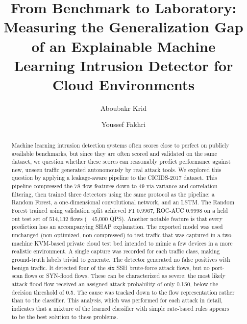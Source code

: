 \documentclass[runningheads]{llncs}
\begin{document}
\title{From Benchmark to Laboratory: Measuring the Generalization Gap of an Explainable Machine Learning Intrusion Detector for Cloud Environments}


\author{Aboubakr Krid \and
Youssef Fakhri}



\maketitle

\begin{abstract}
Machine learning intrusion detection systems often scores close to perfect on publicly available benchmarks, but since they are often scored and validated on the same dataset, we question whether these scores can reasonably predict performance against new, unseen traffic generated autonomously by real attack tools. We explored this question by applying a leakage-aware pipeline to the CICIDS-2017 dataset. This pipeline compressed the 78 flow features down to 49 via variance and correlation filtering, then trained three detectors using the same protocol as the pipeline: a Random Forest, a one-dimensional convolutional network, and an LSTM.
The Random Forest trained using validation split achieved F1 0.9967, ROC-AUC 0.9998 on a held out test set of 514,132 flows (~ 45,000 QPS). Another notable feature is that every prediction has an accompanying SHAP explanation. The exported model was used unchanged (non-optimized, non-compressed) to test traffic that was captured in a two-machine KVM-based private cloud test bed intended to mimic a few devices in a more realistic environment.
A single capture was recorded for each traffic class, making ground-truth labels trivial to generate.
The detector generated no false positives with benign traffic. It detected four of the six SSH brute-force attack flows, but no port-scan flows or SYN-flood flows.
These can be characterized as severe; the most likely attack flood flow received an assigned attack probability of only 0.150, below the decision threshold of 0.5. The cause was tracked down to the flow representation rather than to the classifier. This analysis, which was performed for each attack in detail, indicates that a mixture of the learned classifier with simple rate-based rules appears to be the best solution to these problems.
\end{abstract}
\end{document}
